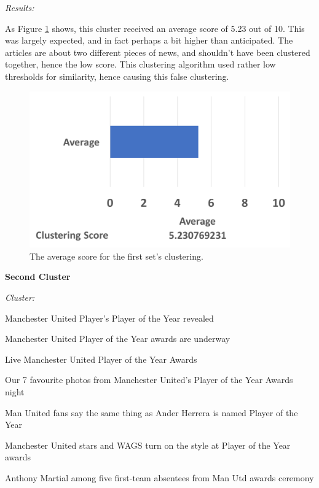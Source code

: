 \documentclass[12pt]{article}
\begin{document}
\emph{Results:}

As Figure \ref{cluster1} shows, this cluster received an average score of 5.23 out of 10. This was largely expected, and in fact perhaps a bit higher than anticipated. The articles are about two different pieces of news, and shouldn't have been clustered together, hence the low score. This clustering algorithm used rather low thresholds for similarity, hence causing this false clustering.  \\

\begin{figure}[ht!]
  \centering
    \includegraphics[scale=0.6]{cluster1score.png}
   \caption[The average score for a cluster]{The average score for the first set's clustering.}
   \label{cluster1}
\end{figure} 

\textbf{Second Cluster}

\begin{mdframed}

\emph{Cluster:}

Manchester United Player's Player of the Year revealed \cite{united1}

Manchester United Player of the Year awards are underway \cite{united2}

Live Manchester United Player of the Year Awards \cite{united3}

Our 7 favourite photos from Manchester United's Player of the Year Awards night \cite{united4}

Man United fans say the same thing as Ander Herrera is named Player of the Year \cite{united5}

Manchester United stars and WAGS turn on the style at Player of the Year awards \cite{united6}

Anthony Martial among five first-team absentees from Man Utd awards ceremony \cite{united7} \\

\end{mdframed}
\end{document}
